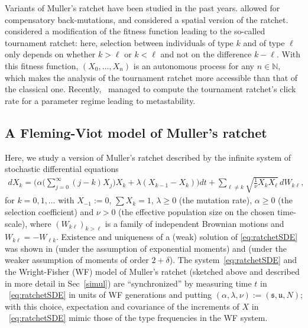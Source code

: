 \documentclass{imsart}
\theoremstyle{plain}
\theoremstyle{definition}
\begin{document}
Variants of Muller's ratchet have been studied in the past years. \cite{pfaffelhuber2012muller} allowed for compensatory back-mutations, and \cite{foutel2020spatial} considered a spatial version of the ratchet. \cite{gonzalez2023quasi} considered a modification of the fitness function leading to the so-called tournament ratchet: here, selection between individuals of type $k$ and of type $\ell$ only depends on whether $k > \ell$ or $k < \ell$ and not on the difference $k-\ell$. With this fitness function, $(X_0, ..., X_n)$ is an autonomous process for any $n \in \mathbb N$, which makes the analysis of the tournament ratchet more accessible than that of the classical one. Recently,~\cite{ISW2025} managed to compute the tournament ratchet's click rate for a parameter regime leading to metastability. 


\subsection{A Fleming-Viot model of Muller's ratchet}
Here, we study a version of Muller's ratchet described by the infinite system of stochastic differential equations
\begin{align}\label{eq:ratchetSDE}
  d X_k = \Big( \alpha \Big(\sum_{j=0}^\infty (j-k)X_j\Big) X_k + \lambda(X_{k-1} - X_k)\Big)dt + \sum_{\ell \neq k}\sqrt{\frac 1{\nu} X_k X_\ell} \, dW_{k\ell}, 
\end{align}
for $k=0,1,\ldots$ with $X_{-1}:=0$, $\sum X_k=1$, $\lambda\geq 0$ (the mutation rate), $\alpha\geq 0$ (the selection coefficient) and $\nu>0$ (the effective population size on the chosen time-scale), where $(W_{k\ell})_{k>\ell}$ is a family of independent Brownian motions and $W_{k\ell} = -W_{\ell k}$. Existence and uniqueness of a (weak) solution of \eqref{eq:ratchetSDE} was shown in \cite{pfaffelhuber2012muller} (under the assumption of exponential moments) and \cite{audiffren2013muller} (under the weaker assumption of moments of order $2 + \delta$). The system~\eqref{eq:ratchetSDE} and the Wright-Fisher (WF)  model of Muller's ratchet  (sketched above and described in more detail in Sec~\ref{simul}) are ``synchronized'' by measuring time $t$ in ~\eqref{eq:ratchetSDE} in units of WF generations and putting $(\alpha, \lambda, \nu):= (\mathfrak s, \mathfrak u, N)$; with this choice, expectation and covariance of the increments of $X$ in ~\eqref{eq:ratchetSDE} mimic those of the type frequencies in the WF system.
\end{document}
